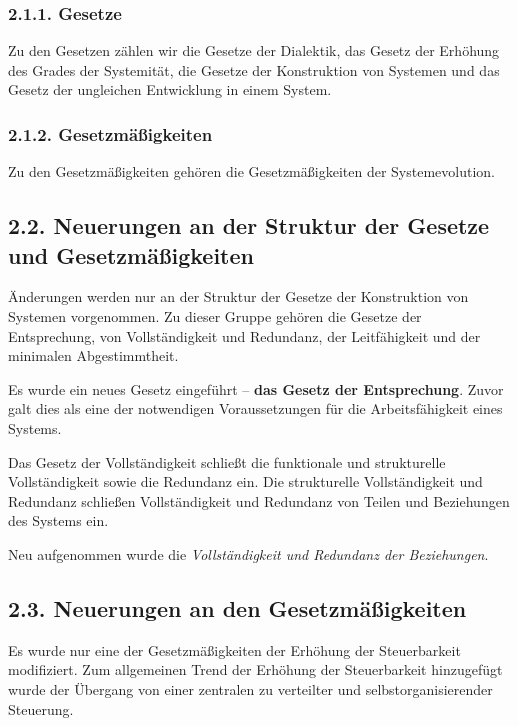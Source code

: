 \documentclass[11pt,a4paper]{article}
\begin{document}
\subsubsection{2.1.1. Gesetze}
Zu den Gesetzen zählen wir die Gesetze der Dialektik, das Gesetz der Erhöhung
des Grades der Systemität, die Gesetze der Konstruktion von Systemen und das
Gesetz der ungleichen Entwicklung in einem System.

\subsubsection{2.1.2. Gesetzmäßigkeiten}
Zu den Gesetzmäßigkeiten gehören die Gesetzmäßigkeiten der Systemevolution.

\subsection{2.2. Neuerungen an der Struktur der Gesetze und Gesetzmäßigkeiten} 

Änderungen werden nur an der Struktur der Gesetze der Konstruktion von
Systemen vorgenommen.  Zu dieser Gruppe gehören die Gesetze der Entsprechung,
von Vollständigkeit und Redundanz, der Leitfähigkeit und der minimalen
Abgestimmtheit.

Es wurde ein neues Gesetz eingeführt -- \textbf{das Gesetz der Entsprechung}.
Zuvor galt dies als eine der notwendigen Voraussetzungen für die
Arbeitsfähigkeit eines Systems.

Das Gesetz der Vollständigkeit schließt die funktionale und strukturelle
Vollständigkeit sowie die Redundanz ein.  Die strukturelle Vollständigkeit und
Redundanz schließen Vollständigkeit und Redundanz von Teilen und Beziehungen
des Systems ein.

Neu aufgenommen wurde die \emph{Vollständigkeit und Redundanz der
  Beziehungen}.

\subsection{2.3. Neuerungen an den Gesetzmäßigkeiten}

Es wurde nur eine der Gesetzmäßigkeiten der Erhöhung der Steuerbarkeit
modifiziert.  Zum allgemeinen Trend der Erhöhung der Steuerbarkeit hinzugefügt
wurde der Übergang von einer zentralen zu verteilter und selbstorganisierender
Steuerung.
\end{document}
